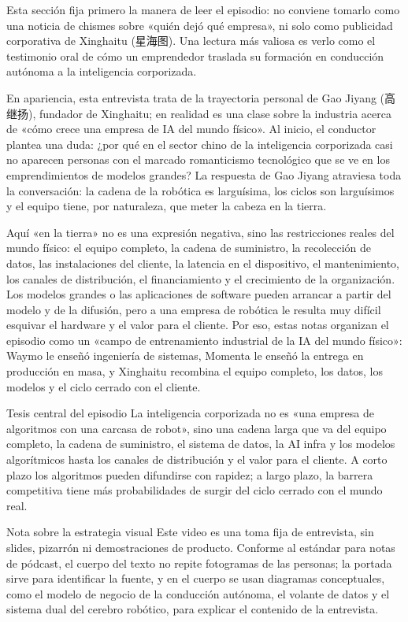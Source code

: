 \documentclass[a4paper]{article}
\begin{document}
Esta sección fija primero la manera de leer el episodio: no conviene tomarlo como una noticia de chismes sobre «quién dejó qué empresa», ni solo como publicidad corporativa de Xinghaitu (星海图). Una lectura más valiosa es verlo como el testimonio oral de cómo un emprendedor traslada su formación en conducción autónoma a la inteligencia corporizada.

En apariencia, esta entrevista trata de la trayectoria personal de Gao Jiyang (高继扬), fundador de Xinghaitu; en realidad es una clase sobre la industria acerca de «cómo crece una empresa de IA del mundo físico». Al inicio, el conductor plantea una duda: ¿por qué en el sector chino de la inteligencia corporizada casi no aparecen personas con el marcado romanticismo tecnológico que se ve en los emprendimientos de modelos grandes? La respuesta de Gao Jiyang atraviesa toda la conversación: la cadena de la robótica es larguísima, los ciclos son larguísimos y el equipo tiene, por naturaleza, que meter la cabeza en la tierra.

Aquí «en la tierra» no es una expresión negativa, sino las restricciones reales del mundo físico: el equipo completo, la cadena de suministro, la recolección de datos, las instalaciones del cliente, la latencia en el dispositivo, el mantenimiento, los canales de distribución, el financiamiento y el crecimiento de la organización. Los modelos grandes o las aplicaciones de software pueden arrancar a partir del modelo y de la difusión, pero a una empresa de robótica le resulta muy difícil esquivar el hardware y el valor para el cliente. Por eso, estas notas organizan el episodio como un «campo de entrenamiento industrial de la IA del mundo físico»: Waymo le enseñó ingeniería de sistemas, Momenta le enseñó la entrega en producción en masa, y Xinghaitu recombina el equipo completo, los datos, los modelos y el ciclo cerrado con el cliente.

\begin{importantbox}{Tesis central del episodio}
La inteligencia corporizada no es «una empresa de algoritmos con una carcasa de robot», sino una cadena larga que va del equipo completo, la cadena de suministro, el sistema de datos, la AI infra y los modelos algorítmicos hasta los canales de distribución y el valor para el cliente. A corto plazo los algoritmos pueden difundirse con rapidez; a largo plazo, la barrera competitiva tiene más probabilidades de surgir del ciclo cerrado con el mundo real.
\end{importantbox}

\begin{knowledgebox}{Nota sobre la estrategia visual}
Este video es una toma fija de entrevista, sin slides, pizarrón ni demostraciones de producto. Conforme al estándar para notas de pódcast, el cuerpo del texto no repite fotogramas de las personas; la portada sirve para identificar la fuente, y en el cuerpo se usan diagramas conceptuales, como el modelo de negocio de la conducción autónoma, el volante de datos y el sistema dual del cerebro robótico, para explicar el contenido de la entrevista.
\end{knowledgebox}
\end{document}
